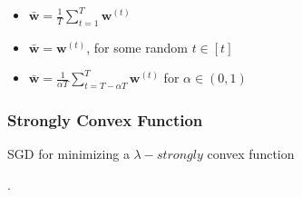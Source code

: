 \begin{itemize}
	\item $ \bar{\mathbf{w}} = \frac{1}{T} \sum^T_{t=1} \mathbf{w}^{(t)} $
	\item $ \bar{\mathbf{w}} = \mathbf{w}^{(t)}$, for some random $ t \in [t] $ 
	\item $ \bar{\mathbf{w}} = \frac{1}{\alpha T} \sum^{T}_{t= T - \alpha T} \mathbf{w}^{(t)} $
		for $ \alpha \in (0, 1) $
\end{itemize}

\subsubsection{Strongly Convex Function}

\begin{algorithm}[h!]
	\caption{SGD for minimizing a $ \lambda-strongly $ convex function}
	\begin{algorithmic}
		\EndFor.
	\end{algorithmic}
\end{algorithm}

